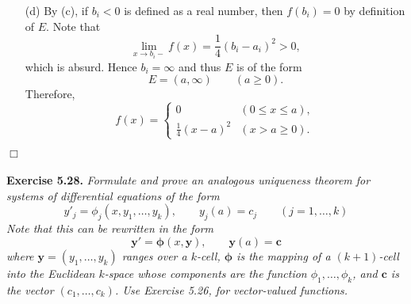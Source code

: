 \documentclass{article}
\begin{document}
\begin{enumerate}
\begin{enumerate}
  \item[(d)]
  By (c), if $b_i < 0$ is defined as a real number,
  then $f(b_i) = 0$ by definition of $E$.
  Note that
  \[
    \lim_{x \to b_i-} f(x) = \frac{1}{4}(b_i - a_i)^2 > 0,
  \]
  which is absurd.
  Hence $b_i = \infty$ and thus $E$ is of the form
  \[
    E = (a,\infty) \qquad (a \geq 0).
  \]
  Therefore,
  \begin{equation*}
  f(x) =
    \begin{cases}
      0                    & (0 \leq x \leq a), \\
      \frac{1}{4}(x - a)^2 & (x > a \geq 0).
    \end{cases}
  \end{equation*}
  \end{enumerate}
\end{enumerate}
$\Box$ \\\\






\textbf{Exercise 5.28.}
\emph{Formulate and prove an analogous uniqueness theorem for
systems of differential equations of the form
\[
  y'_j = \phi_j(x, y_1, \ldots, y_k), \qquad
  y_j(a) = c_j \qquad
  (j = 1, \ldots, k)
\]
Note that this can be rewritten in the form
\[
  \mathbf{y}' = \bm{\phi}(x,\mathbf{y}), \qquad
  \mathbf{y}(a) = \mathbf{c}
\]
where $\mathbf{y} = (y_1, \ldots, y_k)$ ranges over a $k$-cell,
$\bm{\phi}$ is the mapping of a $(k+1)$-cell into the Euclidean $k$-space
whose components are the function $\phi_1, \ldots, \phi_k$,
and $\mathbf{c}$ is the vector $(c_1, \ldots, c_k)$.
Use Exercise 5.26, for vector-valued functions.} \\
\end{document}
